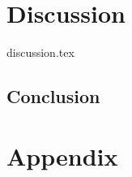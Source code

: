 \documentclass[printGloss, printBibble]{myRUCProject}
\begin{document}
\newpage
\part{Discussion}
{discussion.tex}




\newpage
\chapter{Conclusion}


\appendix
\part*{Appendix}

\end{document}

